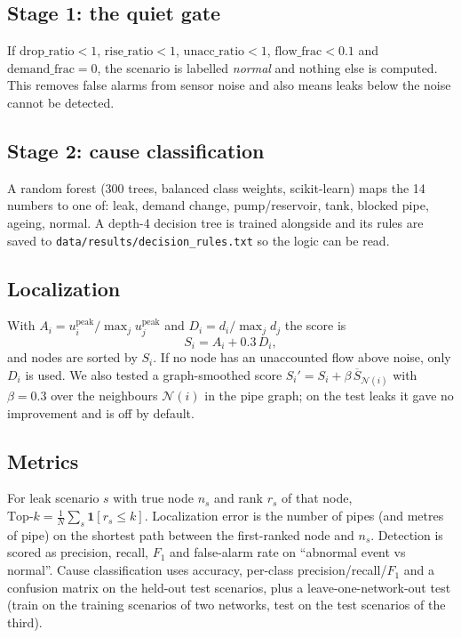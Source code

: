 \documentclass[11pt,a4paper]{article}
\newcommand{\code}[1]{\texttt{#1}}
\begin{document}
\subsection{Stage 1: the quiet gate}
If $\text{drop\_ratio}<1$, $\text{rise\_ratio}<1$, $\text{unacc\_ratio}<1$, $\text{flow\_frac}<0.1$ and $\text{demand\_frac}=0$, the scenario is labelled \emph{normal} and nothing else is computed. This removes false alarms from sensor noise and also means leaks below the noise cannot be detected.

\subsection{Stage 2: cause classification}
A random forest (300 trees, balanced class weights, scikit-learn) maps the 14 numbers to one of: leak, demand change, pump/reservoir, tank, blocked pipe, ageing, normal. A depth-4 decision tree is trained alongside and its rules are saved to \code{data/results/decision\_rules.txt} so the logic can be read.

\subsection{Localization}
With $A_i=u_i^{\text{peak}}/\max_ju_j^{\text{peak}}$ and $D_i=d_i/\max_jd_j$ the score is
\begin{equation}S_i=A_i+0.3\,D_i,\label{eq:score}\end{equation}
and nodes are sorted by $S_i$. If no node has an unaccounted flow above noise, only $D_i$ is used. We also tested a graph-smoothed score $S_i'=S_i+\beta\,\overline{S}_{\mathcal N(i)}$ with $\beta=0.3$ over the neighbours $\mathcal N(i)$ in the pipe graph; on the test leaks it gave no improvement and is off by default.

\subsection{Metrics}
For leak scenario $s$ with true node $n_s$ and rank $r_s$ of that node, $\text{Top-}k=\frac1N\sum_s\mathbf 1[r_s\le k]$. Localization error is the number of pipes (and metres of pipe) on the shortest path between the first-ranked node and $n_s$. Detection is scored as precision, recall, $F_1$ and false-alarm rate on ``abnormal event vs normal''. Cause classification uses accuracy, per-class precision/recall/$F_1$ and a confusion matrix on the held-out test scenarios, plus a leave-one-network-out test (train on the training scenarios of two networks, test on the test scenarios of the third).
\end{document}
